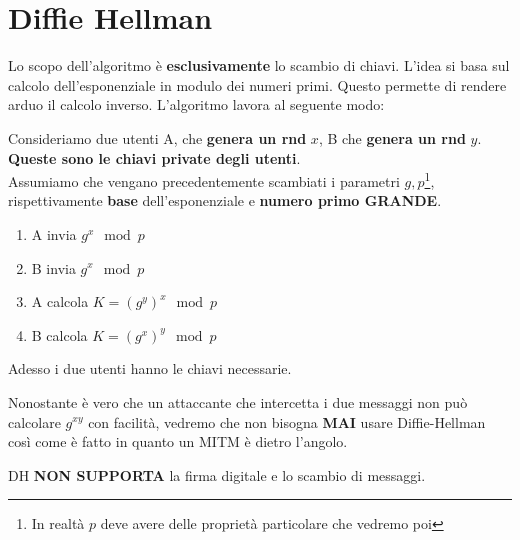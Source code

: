 \section{Diffie Hellman}
Lo scopo dell'algoritmo è \textbf{esclusivamente} lo scambio di chiavi. L'idea si basa sul calcolo dell'esponenziale in modulo dei numeri primi. Questo permette di rendere arduo il calcolo inverso. L'algoritmo lavora al seguente modo:\pagebreak
\begin{definition}\label{def:dh}
Consideriamo due utenti A, che \textbf{genera un rnd} $x$, B che \textbf{genera un rnd} $y$. \textbf{Queste sono le chiavi private degli utenti}.\\
Assumiamo che vengano precedentemente scambiati i parametri $g,p$\footnote{In realtà $p$ deve avere delle proprietà particolare che vedremo poi}, rispettivamente \textbf{base} dell'esponenziale e \textbf{numero primo GRANDE}.
\begin{enumerate}
    \item A invia $g^x\mod{p}$
    \item B invia $g^x\mod{p}$
    \item A calcola $K=(g^y)^x\mod{p}$
    \item B calcola $K=(g^x)^y\mod{p}$
\end{enumerate}
Adesso i due utenti hanno le chiavi necessarie.
\end{definition}
\begin{remark}Nonostante è vero che un attaccante che intercetta i due messaggi non può calcolare $g^{xy}$ con facilità, vedremo che non bisogna \textbf{MAI} usare Diffie-Hellman così come è fatto in quanto un MITM è dietro l'angolo. 
\end{remark}
\begin{note}
DH \textbf{NON SUPPORTA} la firma digitale e lo scambio di messaggi.
\end{note}
